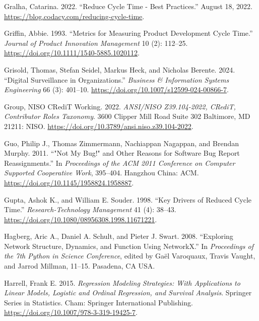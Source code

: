 \documentclass[
]{article}
\newlength{\cslhangindent}
\newenvironment{CSLReferences}[2] %
 {\begin{list}{}{%
  \setlength{\itemindent}{0pt}
  \setlength{\leftmargin}{0pt}
  \setlength{\parsep}{0pt}
  \ifodd #1
   \setlength{\leftmargin}{\cslhangindent}
   \setlength{\itemindent}{-1\cslhangindent}
  \fi
  \setlength{\itemsep}{#2\baselineskip}}}
 {\end{list}}
\begin{document}
\begin{CSLReferences}{1}{0}
Gralha, Catarina. 2022. {``Reduce Cycle Time - Best Practices.''} August
18, 2022. \url{https://blog.codacy.com/reducing-cycle-time}.

Griffin, Abbie. 1993. {``Metrics for {Measuring Product Development
Cycle Time}.''} \emph{Journal of Product Innovation Management} 10 (2):
112--25. \url{https://doi.org/10.1111/1540-5885.1020112}.

Grisold, Thomas, Stefan Seidel, Markus Heck, and Nicholas Berente. 2024.
{``Digital {Surveillance} in {Organizations}.''} \emph{Business \&
Information Systems Engineering} 66 (3): 401--10.
\url{https://doi.org/10.1007/s12599-024-00866-7}.

Group, NISO CRediT Working. 2022. \emph{{ANSI}/{NISO Z39}.104-2022,
{CRediT}, {Contributor Roles Taxonomy}}. 3600 Clipper Mill Road Suite
302 Baltimore, MD 21211: NISO.
\url{https://doi.org/10.3789/ansi.niso.z39.104-2022}.

Guo, Philip J., Thomas Zimmermann, Nachiappan Nagappan, and Brendan
Murphy. 2011. {``"{Not} My Bug!" and Other Reasons for Software Bug
Report Reassignments.''} In \emph{Proceedings of the {ACM} 2011
Conference on {Computer} Supported Cooperative Work}, 395--404. Hangzhou
China: ACM. \url{https://doi.org/10.1145/1958824.1958887}.

Gupta, Ashok K., and William E. Souder. 1998. {``Key {Drivers} of
{Reduced Cycle Time}.''} \emph{Research-Technology Management} 41 (4):
38--43. \url{https://doi.org/10.1080/08956308.1998.11671221}.

Hagberg, Aric A., Daniel A. Schult, and Pieter J. Swart. 2008.
{``Exploring Network Structure, Dynamics, and Function Using
{NetworkX}.''} In \emph{Proceedings of the 7th Python in Science
Conference}, edited by Gaël Varoquaux, Travis Vaught, and Jarrod
Millman, 11--15. Pasadena, CA USA.

Harrell, Frank E. 2015. \emph{Regression {Modeling Strategies}: {With
Applications} to {Linear Models}, {Logistic} and {Ordinal Regression},
and {Survival Analysis}}. Springer {Series} in {Statistics}. Cham:
Springer International Publishing.
\url{https://doi.org/10.1007/978-3-319-19425-7}.


\end{CSLReferences}
\end{document}
